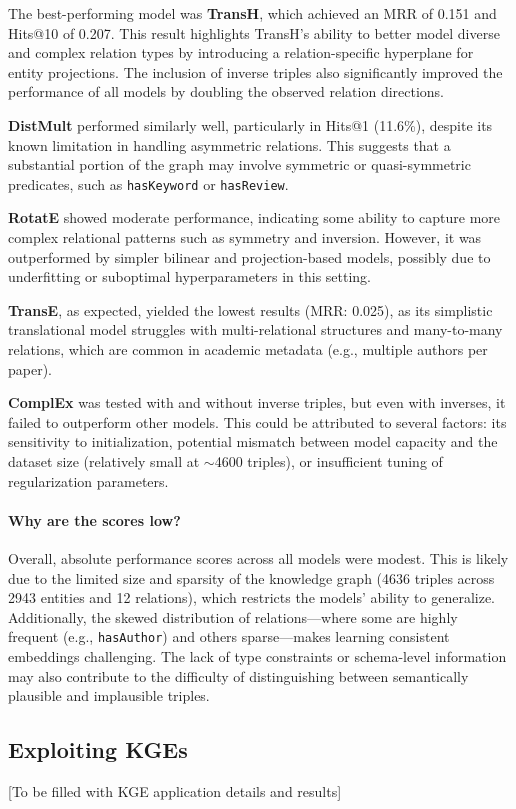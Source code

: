 \documentclass[10pt,a4paper]{article}
\begin{document}
The best-performing model was \textbf{TransH}, which achieved an MRR of 0.151 and Hits@10 of 0.207. This result highlights TransH’s ability to better model diverse and complex relation types by introducing a relation-specific hyperplane for entity projections. The inclusion of inverse triples also significantly improved the performance of all models by doubling the observed relation directions.

\textbf{DistMult} performed similarly well, particularly in Hits@1 (11.6\%), despite its known limitation in handling asymmetric relations. This suggests that a substantial portion of the graph may involve symmetric or quasi-symmetric predicates, such as \texttt{hasKeyword} or \texttt{hasReview}.

\textbf{RotatE} showed moderate performance, indicating some ability to capture more complex relational patterns such as symmetry and inversion. However, it was outperformed by simpler bilinear and projection-based models, possibly due to underfitting or suboptimal hyperparameters in this setting.

\textbf{TransE}, as expected, yielded the lowest results (MRR: 0.025), as its simplistic translational model struggles with multi-relational structures and many-to-many relations, which are common in academic metadata (e.g., multiple authors per paper).

\textbf{ComplEx} was tested with and without inverse triples, but even with inverses, it failed to outperform other models. This could be attributed to several factors: its sensitivity to initialization, potential mismatch between model capacity and the dataset size (relatively small at $\sim$4600 triples), or insufficient tuning of regularization parameters.

\paragraph{Why are the scores low?}
Overall, absolute performance scores across all models were modest. This is likely due to the limited size and sparsity of the knowledge graph (4636 triples across 2943 entities and 12 relations), which restricts the models’ ability to generalize. Additionally, the skewed distribution of relations—where some are highly frequent (e.g., \texttt{hasAuthor}) and others sparse—makes learning consistent embeddings challenging. The lack of type constraints or schema-level information may also contribute to the difficulty of distinguishing between semantically plausible and implausible triples.

\subsection{Exploiting KGEs}
[To be filled with KGE application details and results]
\end{document}
